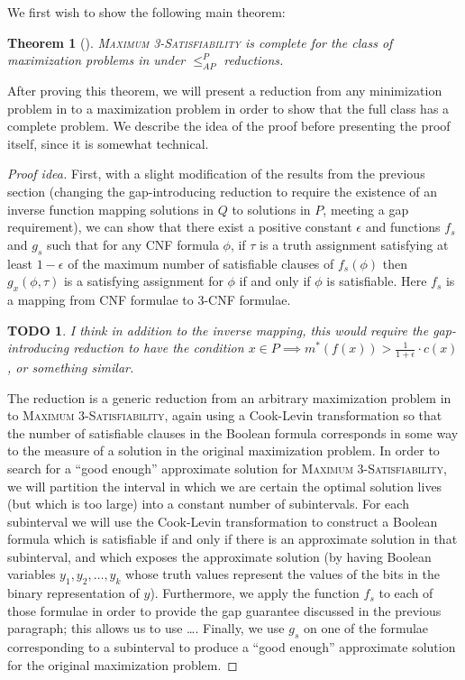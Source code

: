 \documentclass[]{article}
\theoremstyle{plain}
\newtheorem{theorem}{Theorem}
\newtheorem{todo}{TODO}
\theoremstyle{definition}
\newenvironment{proofidea}{\begin{proof}[Proof idea]}{\end{proof}}
\newcommand{\APr}{\leq_{AP}^{P}}
\begin{document}
We first wish to show the following main theorem:

\begin{theorem}[{\cite[Theorem~8.6]{book}}]\label{thm:maxcomplete}
  \textsc{Maximum 3-Satisfiability} is complete for the class of maximization problems in \APX{} under $\APr$ reductions.
\end{theorem}

After proving this theorem, we will present a reduction from any minimization problem in \APX{} to a maximization problem in order to show that the full class \APX{} has a complete problem.
We describe the idea of the proof before presenting the proof itself, since it is somewhat technical.

\begin{proofidea}
  First, with a slight modification of the results from the previous section (changing the gap-introducing reduction to require the existence of an inverse function mapping solutions in $Q$ to solutions in $P$, meeting a gap requirement), we can show that there exist a positive constant $\epsilon$ and functions $f_s$ and $g_s$ such that for any CNF formula $\phi$, if $\tau$ is a truth assignment satisfying at least $1 - \epsilon$ of the maximum number of satisfiable clauses of $f_s(\phi)$ then $g_x(\phi, \tau)$ is a satisfying assignment for $\phi$ if and only if $\phi$ is satisfiable.
  Here $f_s$ is a mapping from CNF formulae to 3-CNF formulae.
  \begin{todo}
    I think in addition to the inverse mapping, this would require the gap-introducing reduction to have the condition $x \in P \implies m^*(f(x)) > \frac{1}{1 + \epsilon} \cdot c(x)$, or something similar.
  \end{todo}

  The reduction is a generic reduction from an arbitrary maximization problem in \APX{} to \textsc{Maximum 3-Satisfiability}, again using a Cook-Levin transformation so that the number of satisfiable clauses in the Boolean formula corresponds in some way to the measure of a solution in the original maximization problem.
  In order to search for a ``good enough'' approximate solution for \textsc{Maximum 3-Satisfiability}, we will partition the interval in which we are certain the optimal solution lives (but which is too large) into a constant number of subintervals.
  For each subinterval we will use the Cook-Levin transformation to construct a Boolean formula which is satisfiable if and only if there is an approximate solution in that subinterval, and which exposes the approximate solution (by having Boolean variables $y_1, y_2, \dotsc, y_k$ whose truth values represent the values of the bits in the binary representation of $y$).
  Furthermore, we apply the function $f_s$ to each of those formulae in order to provide the gap guarantee discussed in the previous paragraph; this allows us to use \ldots.
  Finally, we use $g_s$ on one of the formulae corresponding to a subinterval to produce a ``good enough'' approximate solution for the original maximization problem.
\end{proofidea}
\end{document}
